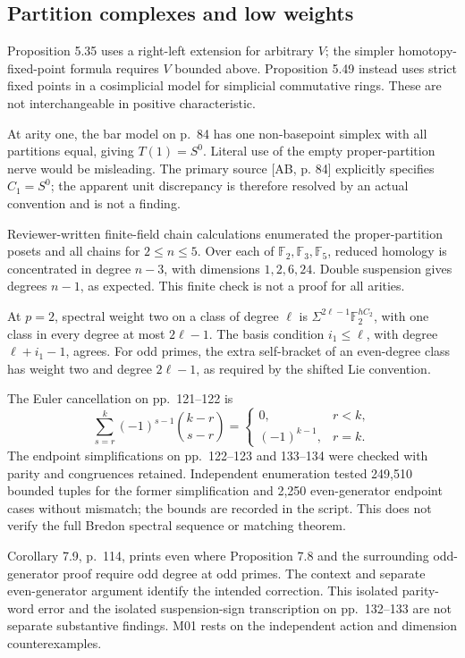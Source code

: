 \documentclass[10pt]{article}
\begin{document}
\subsection*{Partition complexes and low weights}
Proposition 5.35 uses a right-left extension for arbitrary \(V\); the simpler homotopy-fixed-point formula requires \(V\) bounded above. Proposition 5.49 instead uses strict fixed points in a cosimplicial model for simplicial commutative rings. These are not interchangeable in positive characteristic.\par
At arity one, the bar model on p. 84 has one non-basepoint simplex with all partitions equal, giving \(T(1)=S^0\). Literal use of the empty proper-partition nerve would be misleading. The primary source [AB, p. 84] explicitly specifies \(C_1=S^0\); the apparent unit discrepancy is therefore resolved by an actual convention and is not a finding.\par
Reviewer-written finite-field chain calculations enumerated the proper-partition posets and all chains for \(2\le n\le5\). Over each of \(\mathbb F_2,\mathbb F_3,\mathbb F_5\), reduced homology is concentrated in degree \(n-3\), with dimensions \(1,2,6,24\). Double suspension gives degrees \(n-1\), as expected. This finite check is not a proof for all arities.\par
At \(p=2\), spectral weight two on a class of degree \(\ell\) is \(\Sigma^{2\ell-1}\mathbb F_2^{hC_2}\), with one class in every degree at most \(2\ell-1\). The basis condition \(i_1\le\ell\), with degree \(\ell+i_1-1\), agrees. For odd primes, the extra self-bracket of an even-degree class has weight two and degree \(2\ell-1\), as required by the shifted Lie convention.\par
The Euler cancellation on pp. 121–122 is \[\sum_{s=r}^{k}(-1)^{s-1}\binom{k-r}{s-r}
 =
 \begin{cases}0,&r<k,\\(-1)^{k-1},&r=k.\end{cases}\] The endpoint simplifications on pp. 122–123 and 133–134 were checked with parity and congruences retained. Independent enumeration tested 249,510 bounded tuples for the former simplification and 2,250 even-generator endpoint cases without mismatch; the bounds are recorded in the script. This does not verify the full Bredon spectral sequence or matching theorem.\par
Corollary 7.9, p. 114, prints even where Proposition 7.8 and the surrounding odd-generator proof require odd degree at odd primes. The context and separate even-generator argument identify the intended correction. This isolated parity-word error and the isolated suspension-sign transcription on pp. 132–133 are not separate substantive findings. M01 rests on the independent action and dimension counterexamples.\par
\end{document}

